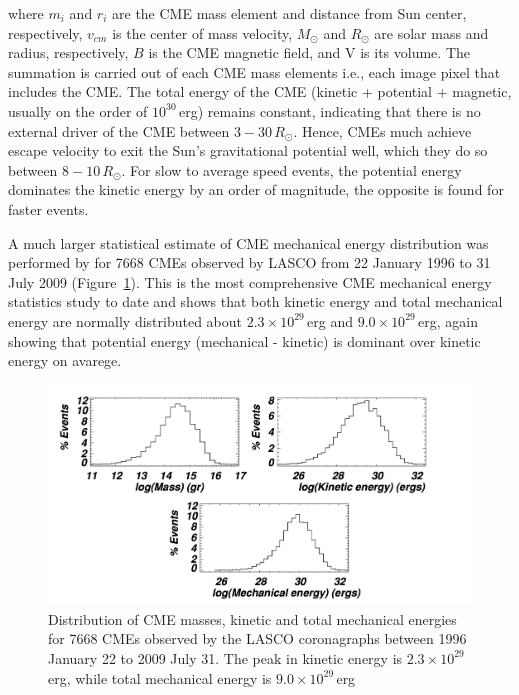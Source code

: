 where $m_i$ and $r_i$ are the CME mass element and distance from Sun center, respectively, $v_{cm}$ is the center of mass velocity, $M_{\odot}$ and $R_{\odot}$ are solar mass and radius, respectively, $B$ is the CME magnetic field, and V is its volume. The summation is carried out of each CME mass elements i.e., each image pixel that includes the CME. The total energy of the CME (kinetic + potential + magnetic, usually on the order of $10^{30}$\,erg) remains constant, indicating that there is no external driver of the CME between $3-30\,R_{\odot}$. Hence, CMEs much achieve escape velocity to exit the Sun's gravitational potential well, which they do so between $8-10\,R_{\odot}$. For slow to average speed events, the potential energy dominates the kinetic energy by an order of magnitude, the opposite is found for faster events. 

A much larger statistical estimate of CME mechanical energy distribution was performed by \citep{vour2010} for 7668 CMEs observed by LASCO from 22 January 1996 to 31 July 2009 (Figure~\ref{fig:energy_dist}). This is the most comprehensive CME mechanical energy statistics study to date and shows that both kinetic energy and total mechanical energy are normally distributed about $2.3\times10^{29}$\,erg and $9.0\times10^{29}$\,erg, again showing that potential energy (mechanical - kinetic) is dominant over kinetic energy on avarege.
\begin{figure}[h!]
\begin{center}
\includegraphics[trim = 1cm 0cm 0cm 3cm, scale=0.3]{images/energy_dist}
\caption[Distribution of CME masses, kinetic and total mechanical energies]{Distribution of CME masses, kinetic and total mechanical energies for 7668 CMEs observed by the LASCO
coronagraphs between 1996 January 22 to 2009 July 31. The peak in kinetic energy is $2.3\times10^{29}$\,erg, while total mechanical energy is $9.0\times10^{29}$\,erg \citep{vour2010}}
\label{fig:energy_dist}
\end{center}
\end{figure}

